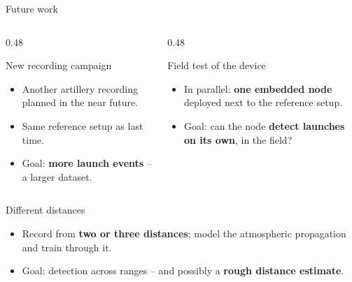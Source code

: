 \documentclass[aspectratio=169,10pt]{beamer}
\begin{document}
\begin{frame}{Future work}
  \begin{columns}[T,onlytextwidth]
    \begin{column}{0.48\textwidth}
      \begin{block}{\faMicrophone\enspace New recording campaign}
        \small
        \begin{itemize}\small
          \item Another artillery recording planned in the near future.
          \item Same reference setup as last time.
          \item Goal: \textbf{more launch events} -- a larger dataset.
        \end{itemize}
      \end{block}
    \end{column}
    \begin{column}{0.48\textwidth}
      \begin{block}{\faMicrochip\enspace Field test of the device}
        \small
        \begin{itemize}\small
          \item In parallel: \textbf{one embedded node} deployed next to the
                reference setup.
          \item Goal: can the node \textbf{detect launches on its own}, in the field?
        \end{itemize}
      \end{block}
    \end{column}
  \end{columns}
  \vspace{2mm}
  \begin{block}{\faWaveSquare\enspace Different distances}
    \small
    \begin{itemize}\small
      \item Record from \textbf{two or three distances}; model the atmospheric
            propagation and train through it.
      \item Goal: detection across ranges -- and possibly a \textbf{rough distance
            estimate}.
    \end{itemize}
  \end{block}
\end{frame}
\end{document}
